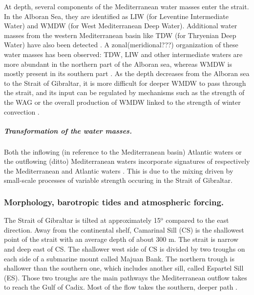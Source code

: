 At depth, several components of the Mediterranean water masses enter the strait. In the Alboran Sea, they are identified as LIW (for Leventine Intermediate Water) and WMDW (for West Mediterranean Deep Water).  Additional water masses from the western Mediterranean basin like TDW (for Thryenian Deep Water) have also been detected \citep{millot_2014}. A zonal(\color{blue}meridional???\color{black}) organization of these water masses has been observed: TDW, LIW and other intermediate waters are \color{black} more abundant in the northern part of the Alboran sea, whereas WMDW is mostly present in its southern part \citep{millot_2014}. As the depth decreases from the Alboran sea to the Strait of Gibraltar, it is more difficult for deeper WMDW to pass through the strait, and its input can be regulated by mechanisms such as the strength of the WAG or the overall production of WMDW linked to the strength of winter convection \citep{naranjo_2012}.

\subparagraph{Transformation of the water masses.}
Both the inflowing (in reference to the Mediterranean basin) Atlantic waters or the outflowing (ditto) Mediterranean waters incorporate signatures of respectively the Mediterranean \citep{macias_2006} and Atlantic waters \citep{millot_2007,garcia-lafuente_2011}. This is due to the mixing driven by small-scale processes of variable strength occuring in the Strait of Gibraltar.  


\subsubsection{Morphology, barotropic tides and atmospheric forcing.} 


The Strait of Gibraltar is tilted at approximately 15$^\text{o}$ compared to the east direction. Away from the continental shelf, Camarinal Sill (CS) is the shallowest point of the strait with an average depth of about 300 m. The strait is narrow and deep east of CS. The shallower west side of CS is divided by two troughs on each side of a submarine mount called Majuan Bank. The northern trough is shallower than the southern one, which includes another sill, called Espartel Sill (ES). Those two troughs are the main pathways the Mediterranean outflow takes to reach the Gulf of Cadix. Most of the flow takes the southern, deeper path \citep{soto-navarro_2015}.

